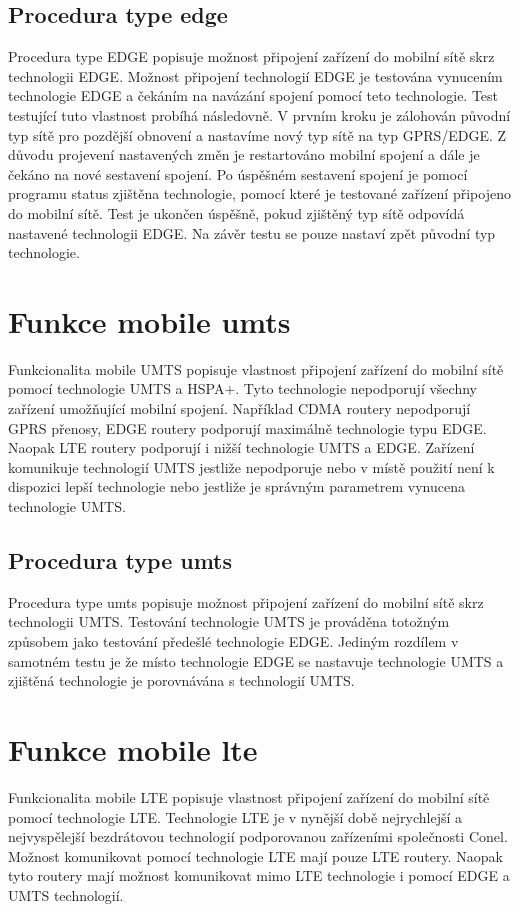 \subsection{Procedura type edge}
Procedura type EDGE popisuje možnost připojení zařízení do mobilní sítě skrz technologii EDGE. Možnost připojení technologií EDGE je testována vynucením technologie EDGE a čekáním na navázání spojení pomocí teto technologie. Test testující tuto vlastnost probíhá následovně. V prvním kroku je zálohován původní typ sítě pro pozdější obnovení a nastavíme nový typ sítě na typ GPRS/EDGE. Z důvodu projevení nastavených změn je restartováno mobilní spojení a dále je čekáno na nové sestavení spojení. Po úspěšném sestavení spojení je pomocí programu status zjištěna technologie, pomocí které je testované zařízení připojeno do mobilní sítě. Test je ukončen úspěšně, pokud zjištěný typ sítě odpovídá nastavené technologii EDGE. Na závěr testu se pouze nastaví zpět původní typ technologie.

\section{Funkce mobile umts}
Funkcionalita mobile UMTS popisuje vlastnost připojení zařízení do mobilní sítě pomocí technologie UMTS a HSPA+. Tyto technologie nepodporují všechny zařízení umožňující mobilní spojení. Například CDMA routery nepodporují GPRS přenosy, EDGE routery podporují maximálně technologie typu EDGE. Naopak LTE routery podporují i nižší technologie UMTS a EDGE. Zařízení komunikuje technologií UMTS jestliže nepodporuje nebo v místě použití není k dispozici lepší technologie nebo jestliže je správným parametrem vynucena technologie UMTS.

\subsection{Procedura type umts}
Procedura type umts popisuje možnost připojení zařízení do mobilní sítě skrz technologii UMTS. Testování technologie UMTS je prováděna totožným způsobem jako testování předešlé technologie EDGE. Jediným rozdílem v samotném testu je že místo technologie EDGE se nastavuje technologie UMTS a zjištěná technologie je porovnávána s technologií UMTS.

\section{Funkce mobile lte}
Funkcionalita mobile LTE popisuje vlastnost připojení zařízení do mobilní sítě pomocí technologie LTE. Technologie LTE je v nynější době nejrychlejší a nejvyspělejší bezdrátovou technologií podporovanou zařízeními společnosti Conel. Možnost komunikovat pomocí technologie LTE mají pouze LTE routery. Naopak tyto routery mají možnost komunikovat mimo LTE technologie i pomocí EDGE a UMTS technologií.

